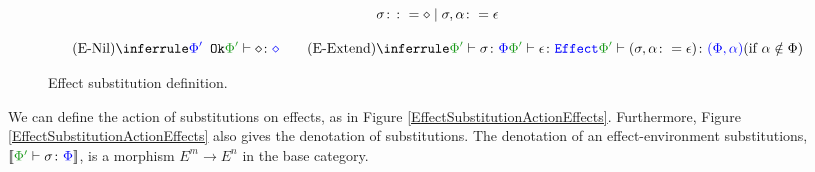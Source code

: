\begin{figure}[H]
    \centering
    \begin{framed}
        \[
    \sigma \colon\colon= \diamond \mid \sigma, \alpha \colon= \epsilon    
\]



\[
    \ntreeruleI{\esubnil}{\ok{\P'}}{\typerelation{\P'}{\nil}{\nil}}
    \quad\quad
    \condtreeruleII{\esubextend}{\typerelation{\P'}{\si}{\P}}{\wellformedeffect{\P'}{\e}}{\typerelation{\P'}{(\si, \a \setto\e)}{(\P, \a)}}{\a\notin\P}
\]
    \end{framed}
    
    \caption{Effect substitution definition.}
    \label{EffectSubstitutionDefinition}
\end{figure}


We can define the action of substitutions on effects, as in Figure \ref{EffectSubstitutionActionEffects}. Furthermore, Figure \ref{EffectSubstitutionActionEffects} also gives the denotation of substitutions. The denotation of an effect-environment substitutions, $\deno{\typerelation{\P'}{\si}{\P}}$, is a morphism $E^m \rightarrow E^n$ in the base category.



